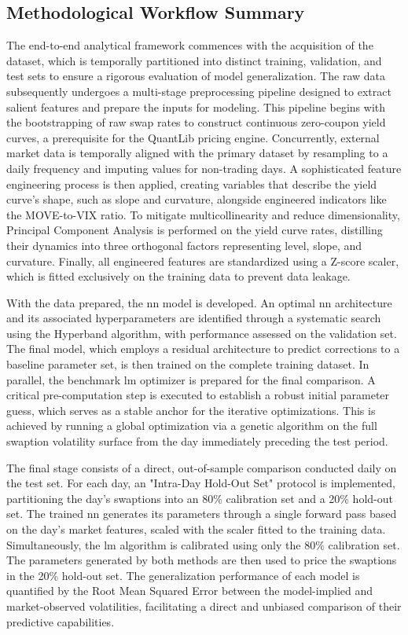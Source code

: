 \subsection{Methodological Workflow Summary}
The end-to-end analytical framework commences with the acquisition of the dataset, which is temporally partitioned into distinct training, validation, and test sets to ensure a rigorous evaluation of model generalization. The raw data subsequently undergoes a multi-stage preprocessing pipeline designed to extract salient features and prepare the inputs for modeling. This pipeline begins with the bootstrapping of raw swap rates to construct continuous zero-coupon yield curves, a prerequisite for the QuantLib pricing engine. Concurrently, external market data is temporally aligned with the primary dataset by resampling to a daily frequency and imputing values for non-trading days. A sophisticated feature engineering process is then applied, creating variables that describe the yield curve's shape, such as slope and curvature, alongside engineered indicators like the MOVE-to-VIX ratio. To mitigate multicollinearity and reduce dimensionality, Principal Component Analysis is performed on the yield curve rates, distilling their dynamics into three orthogonal factors representing level, slope, and curvature. Finally, all engineered features are standardized using a Z-score scaler, which is fitted exclusively on the training data to prevent data leakage.

With the data prepared, the \ac{nn} model is developed. An optimal \ac{nn} architecture and its associated hyperparameters are identified through a systematic search using the Hyperband algorithm, with performance assessed on the validation set. The final model, which employs a residual architecture to predict corrections to a baseline parameter set, is then trained on the complete training dataset. In parallel, the benchmark \ac{lm} optimizer is prepared for the final comparison. A critical pre-computation step is executed to establish a robust initial parameter guess, which serves as a stable anchor for the iterative optimizations. This is achieved by running a global optimization via a genetic algorithm on the full swaption volatility surface from the day immediately preceding the test period.

The final stage consists of a direct, out-of-sample comparison conducted daily on the test set. For each day, an "Intra-Day Hold-Out Set" protocol is implemented, partitioning the day's swaptions into an 80\% calibration set and a 20\% hold-out set. The trained \ac{nn} generates its parameters through a single forward pass based on the day's market features, scaled with the scaler fitted to the training data. Simultaneously, the \ac{lm} algorithm is calibrated using only the 80\% calibration set. The parameters generated by both methods are then used to price the swaptions in the 20\% hold-out set. The generalization performance of each model is quantified by the Root Mean Squared Error between the model-implied and market-observed volatilities, facilitating a direct and unbiased comparison of their predictive capabilities.

